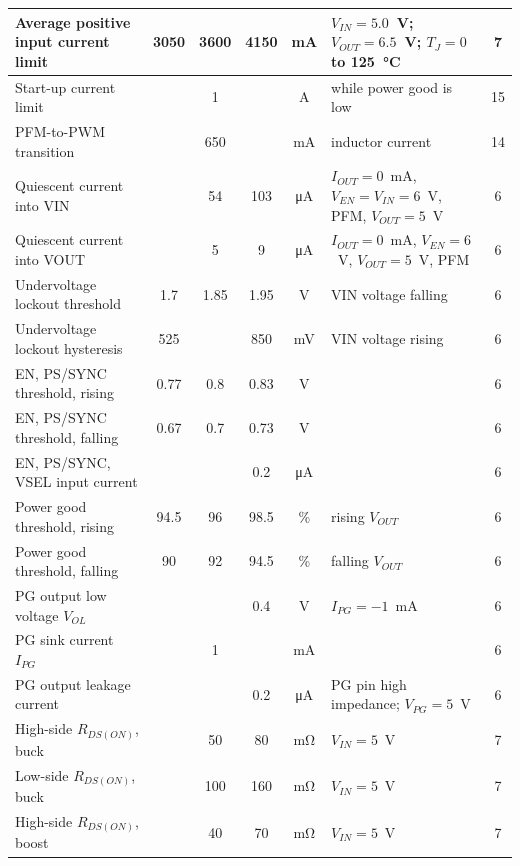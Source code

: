 {\begin{longtable}{|L{4.4cm}|c|c|c|c|L{3.6cm}|c|}
\hline
Average positive input current limit & \num{3050} & \num{3600} & \num{4150} & \si{\milli\ampere} & \(V_{IN}=5.0\)~V; \(V_{OUT}=6.5\)~V; \(T_J=0\) to \SI{125}{\celsius} & 7 \\
\hline
Start-up current limit & & \num{1} & & \si{\ampere} & while power good is low & 15 \\
\hline
PFM-to-PWM transition & & \num{650} & & \si{\milli\ampere} & inductor current & 14 \\
\hline
Quiescent current into VIN & & \num{54} & \num{103} & \si{\micro\ampere} & \(I_{OUT}=0\)~mA, \(V_{EN}=V_{IN}=6\)~V, PFM, \(V_{OUT}=5\)~V & 6 \\
\hline
Quiescent current into VOUT & & \num{5} & \num{9} & \si{\micro\ampere} & \(I_{OUT}=0\)~mA, \(V_{EN}=6\)~V, \(V_{OUT}=5\)~V, PFM & 6 \\
\hline
Undervoltage lockout threshold & \num{1.7} & \num{1.85} & \num{1.95} & \si{\volt} & VIN voltage falling & 6 \\
\hline
Undervoltage lockout hysteresis & \num{525} & & \num{850} & \si{\milli\volt} & VIN voltage rising & 6 \\
\hline
EN, PS/SYNC threshold, rising & \num{0.77} & \num{0.8} & \num{0.83} & \si{\volt} & & 6 \\
\hline
EN, PS/SYNC threshold, falling & \num{0.67} & \num{0.7} & \num{0.73} & \si{\volt} & & 6 \\
\hline
EN, PS/SYNC, VSEL input current & & & \num{0.2} & \si{\micro\ampere} & & 6 \\
\hline
Power good threshold, rising & \num{94.5} & \num{96} & \num{98.5} & \% & rising \(V_{OUT}\) & 6 \\
\hline
Power good threshold, falling & \num{90} & \num{92} & \num{94.5} & \% & falling \(V_{OUT}\) & 6 \\
\hline
PG output low voltage \(V_{OL}\) & & & \num{0.4} & \si{\volt} & \(I_{PG}=-1\)~mA & 6 \\
\hline
PG sink current \(I_{PG}\) & & \num{1} & & \si{\milli\ampere} & & 6 \\
\hline
PG output leakage current & & & \num{0.2} & \si{\micro\ampere} & PG pin high impedance; \(V_{PG}=5\)~V & 6 \\
\hline
High-side \(R_{DS(ON)}\), buck & & \num{50} & \num{80} & \si{\milli\ohm} & \(V_{IN}=5\)~V & 7 \\
\hline
Low-side \(R_{DS(ON)}\), buck & & \num{100} & \num{160} & \si{\milli\ohm} & \(V_{IN}=5\)~V & 7 \\
\hline
High-side \(R_{DS(ON)}\), boost & & \num{40} & \num{70} & \si{\milli\ohm} & \(V_{IN}=5\)~V & 7 \\

\end{longtable}}
